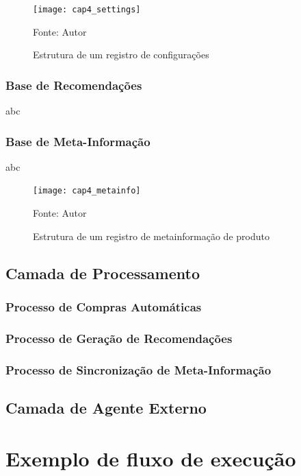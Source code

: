 \begin{figure}[htb]
    \caption{Estrutura de um registro de configurações}
    \label{fig:cap4_settings}
    \texttt{[image: cap4\_settings]}
    
    Fonte: Autor
\end{figure}

\subsubsection{Base de Recomendações}
abc


\subsubsection{Base de Meta-Informação}
abc

\begin{figure}[htb]
    \caption{Estrutura de um registro de metainformação de produto}
    \label{fig:cap4_metainfo}
    \texttt{[image: cap4\_metainfo]}
    
    Fonte: Autor
\end{figure}


\subsection{Camada de Processamento}
\lipsum[1]
\subsubsection{Processo de Compras Automáticas}

\subsubsection{Processo de Geração de Recomendações}

\subsubsection{Processo de Sincronização de Meta-Informação}


\subsection{Camada de Agente Externo}
\lipsum[1]

\section{Exemplo de fluxo de execução}